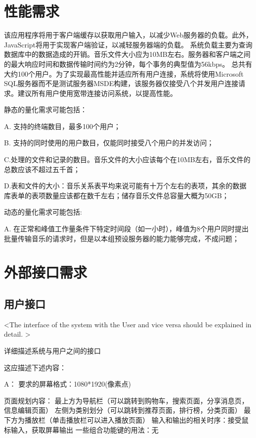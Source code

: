 			   
\section{性能需求}
该应用程序将用于客户端缓存以获取用户输入，以减少Web服务器的负载。此外，JavaScript将用于实现客户端验证，以减轻服务器端的负载。
系统负载主要为查询数据库中的数据造成的开销。音乐文件大小应为10MB左右。服务器和客户端之间的最大响应时间和数据传输时间约为2分钟，每个事务的典型值为56kbps。
总共有大约100个用户。为了实现最高性能并适应所有用户连接，系统将使用Microsoft SQL服务器而不是测试服务器MSDE构建，该服务器仅接受八个并发用户连接请求。建议所有用户使用宽带连接访问系统，以提高性能。


静态的量化需求可能包括：

A. 支持的终端数目，最多100个用户；

B. 支持的同时使用的用户数目，仅能同时接受八个用户的并发访问；

C.处理的文件和记录的数目。音乐文件的大小应该每个在10MB左右，音乐文件的总数应该不超过五千首；

D.表和文件的大小：音乐关系表平均来说可能有十万个左右的表项，其余的数据库表单的表项数量应该都在数千左右；储存音乐文件总容量大概为50GB；

动态的量化需求可能包括:

A. 在正常和峰值工作量条件下特定时间段（如一小时），峰值为8个用户同时提出批量传输音乐的请求时，但是以本组预设服务器的能力能够完成，不成问题；




\section{外部接口需求}

\subsection{用户接口}
<The interface of the system with the User and vice versa should be explained in detail. >

详细描述系统与用户之间的接口


这应描述下述内容：

A：
要求的屏幕格式：1080*1920(像素点)

页面规划内容：
最上方为导航栏（可以跳转到购物车，搜索页面，分享消息页，信息编辑页面）
左侧为类别划分（可以跳转到推荐页面，排行榜，分类页面）
最下方为播放栏（单击播放栏可以进入播放页面）
输入和输出的相关时序：接受鼠标输入，获取屏幕输出
一些组合功能键的用法：无

